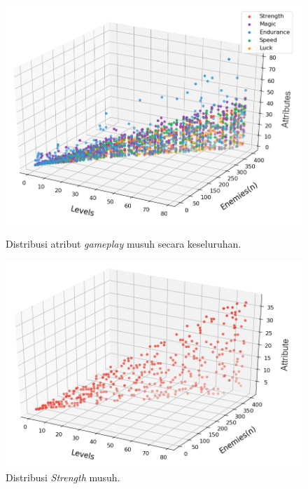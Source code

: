 \begin{figure} [!h] \centering
	\includegraphics[scale=0.6]{img/EnemyStatsDistrib.png}
	\caption{Distribusi atribut \textit{gameplay} musuh secara keseluruhan.}
	\label{fig:enemy_stats_distrib}
	\vspace{5ex}

	\includegraphics[scale=0.6]{img/EnemyStrengthDistrib.png}
	\caption{Distribusi \textit{Strength} musuh.}
	\label{fig:enemy_str_distrib}
\end{figure}
\clearpage

